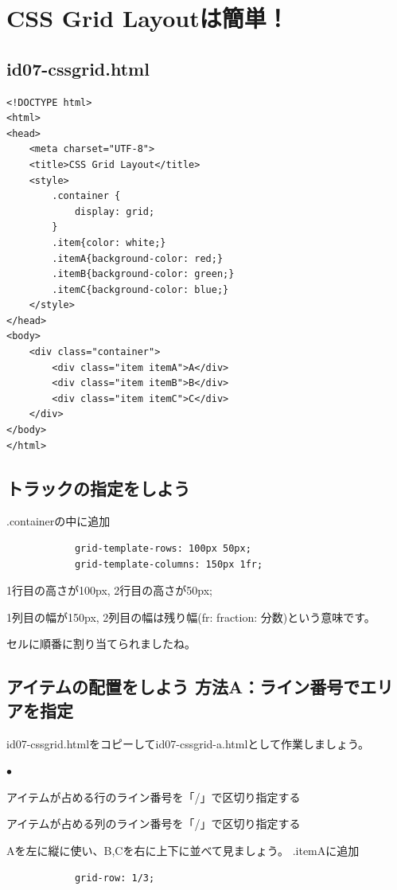 \documentclass[mingoth,11pt,a4j,uplatex,dvipdfmx]{jsarticle}
\renewenvironment{description}%
{%
   \begin{list}{\parbox{1zw}{$\bullet$}}%
   {%
      \setlength{\topsep}{1zh}
      \setlength{\itemindent}{3zw}
      \setlength{\leftmargin}{5zw}%
      \setlength{\rightmargin}{0zw}%
      \setlength{\labelsep}{1zw}%
      \setlength{\labelwidth}{3zw}%
      \setlength{\itemsep}{0em}%
      \setlength{\parsep}{0em}%
      \setlength{\listparindent}{0zw}%
   }
}{%
   \end{list}%
}
\begin{document}
\section{CSS Grid Layoutは簡単！}
\subsection{id07-cssgrid.html}
\begin{lstlisting}
<!DOCTYPE html>
<html>
<head>
    <meta charset="UTF-8">
    <title>CSS Grid Layout</title>
    <style>
        .container {
            display: grid;
        }
        .item{color: white;}
        .itemA{background-color: red;}
        .itemB{background-color: green;}
        .itemC{background-color: blue;}
    </style>
</head>
<body>
    <div class="container">
        <div class="item itemA">A</div>
        <div class="item itemB">B</div>
        <div class="item itemC">C</div>
    </div>
</body>
</html>
\end{lstlisting}

\subsection{トラックの指定をしよう}
.containerの中に追加
\begin{lstlisting}
            grid-template-rows: 100px 50px;
            grid-template-columns: 150px 1fr;
\end{lstlisting}
1行目の高さが100px, 2行目の高さが50px;

1列目の幅が150px, 2列目の幅は残り幅(fr: fraction: 分数)という意味です。

セルに順番に割り当てられましたね。

\subsection{アイテムの配置をしよう 方法A：ライン番号でエリアを指定}
id07-cssgrid.htmlをコピーしてid07-cssgrid-a.htmlとして作業しましょう。
\begin{description}
\item[gird-row] アイテムが占める行のライン番号を「/」で区切り指定する
\item[grid-column] アイテムが占める列のライン番号を「/」で区切り指定する
\end{description}
Aを左に縦に使い、B,Cを右に上下に並べて見ましょう。
.itemAに追加
\begin{lstlisting}
            grid-row: 1/3;
\end{lstlisting}
\end{document}
